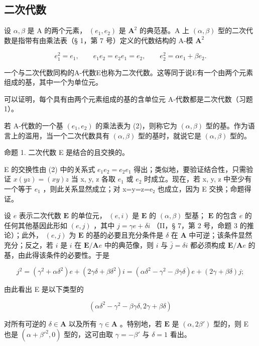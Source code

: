 \subsection{二次代数}

设 \(\alpha, \beta\) 是 A 的两个元素， \((e_1, e_2)\) 是 \(\mathbf{A}^2\) 的典范基。A 上 \((\alpha, \beta)\) 型的二次代数是指带有由乘法表（§ 1，第 7 号）定义的代数结构的 A-模 \(\mathbf{A}^2\)

\[
e _ {1} ^ {2} = e _ {1}, \qquad e _ {1} e _ {2} = e _ {2} e _ {1} = e _ {2}, \qquad e _ {2} ^ {2} = \alpha e _ {1} + \beta e _ {2}.\tag{2}
\]

一个与二次代数同构的A-代数E也称为二次代数。这等同于说E有一个由两个元素组成的基，其中一个为单位元。

可以证明，每个具有由两个元素组成的基的含单位元 A-代数都是二次代数（习题 1）。

若 A-代数的一个基 \((e_{1}, e_{2})\) 的乘法表为 (2)，则称它为 \((\alpha, \beta)\) 型的基。作为语言上的滥用，当一个二次代数具有 \((\alpha, \beta)\) 型的基时，就说它是 \((\alpha, \beta)\) 型的。

命题 1. 二次代数 E 是结合的且交换的。

E 的交换性由 (2) 中的关系式 \(e_{1}e_{2}=e_{2}e_{1}\) 得出；类似地，要验证结合性，只需验证 \(x(yz)=(xy)z\) 当 x, y, z 各取 \(e_{1}\) 或 \(e_{2}\) 时成立。现在，若 x, y, z 中至少有一个等于 \(e_{1}\) ，则此关系显然成立；对 x=y=z=e₂ 也成立，因为 E 交换；命题得证。

设 \(e\) 表示二次代数 \(\mathbf{E}\) 的单位元， \((e, i)\) 是 \(\mathbf{E}\) 的 \((\alpha, \beta)\) 型基； \(\mathbf{E}\) 的包含 \(e\) 的任何其他基因此形如 \((e, j)\) ，其中 \(j = \gamma e + \delta i\) （II，§ 7，第 2 号，命题 3 的推论）；此外， \((e, j)\) 为 \(\mathbf{E}\) 的基的必要且充分条件是 \(\delta\) 在 \(\mathbf{A}\) 中可逆；该条件显然充分；反之，若 \(i\) 是 \(i\) 在 \(\mathbf{E}/\mathbf{A}e\) 中的典范像，则 \(i\) 与 \(\bar{j} = \delta i\) 都必须构成 \(\mathbf{E}/\mathbf{A}e\) 的基，由此得该条件的必要性。于是

\[
j ^ {2} = (\gamma^ {2} + \alpha \delta^ {2}) e + (2 \gamma \delta + \beta \delta^ {2}) i = (\alpha \delta^ {2} - \gamma^ {2} - \beta \gamma \delta) e + (2 \gamma + \beta \delta) j;
\]

由此看出 E 是以下类型的

\[
(\alpha \delta^ {2} - \gamma^ {2} - \beta \gamma \delta , 2 \gamma + \beta \delta)\tag{3}
\]

对所有可逆的 \(\delta \in \mathbf{A}\) 以及所有 \(\gamma \in \mathbf{A}\) 。特别地，若 \(\mathbf{E}\) 是 \((\alpha, 2\beta')\) 型的，则 E 也是 \((\alpha + \beta'^2, 0)\) 型的，这可由取 \(\gamma = -\beta'\) 与 \(\delta = 1\) 看出。

